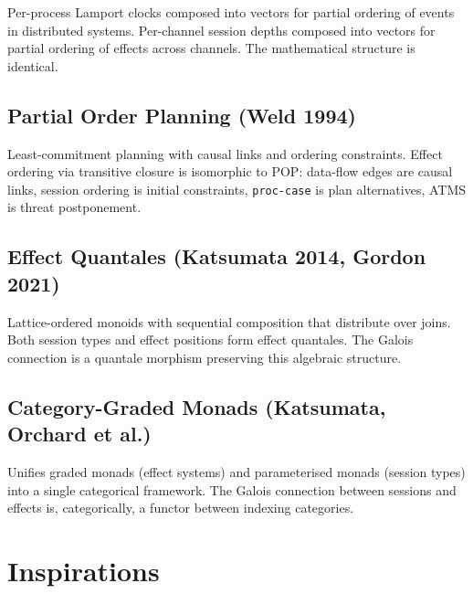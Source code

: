 \documentclass[11pt]{article}
\begin{document}
Per-process Lamport clocks composed into vectors for partial ordering of events
in distributed systems. Per-channel session depths composed into vectors for
partial ordering of effects across channels. The mathematical structure is
identical.
\subsection{Partial Order Planning (Weld 1994)}
\label{sec:orgc510ee4}

Least-commitment planning with causal links and ordering constraints. Effect
ordering via transitive closure is isomorphic to POP: data-flow edges are
causal links, session ordering is initial constraints, \texttt{proc-case} is plan
alternatives, ATMS is threat postponement.
\subsection{Effect Quantales (Katsumata 2014, Gordon 2021)}
\label{sec:org7445308}

Lattice-ordered monoids with sequential composition that distribute over joins.
Both session types and effect positions form effect quantales. The Galois
connection is a quantale morphism preserving this algebraic structure.
\subsection{Category-Graded Monads (Katsumata, Orchard et al.)}
\label{sec:org3300b4d}

Unifies graded monads (effect systems) and parameterised monads (session types)
into a single categorical framework. The Galois connection between sessions
and effects is, categorically, a functor between indexing categories.
\section{Inspirations}
\label{sec:orgf70071c}
\end{document}
